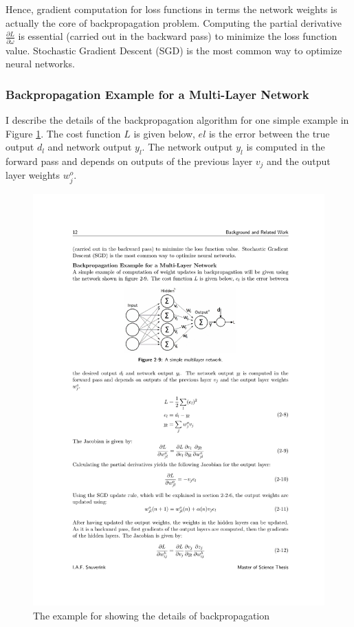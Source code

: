     Hence, gradient computation for loss functions in terms the network weights is actually the core of backpropagation problem. Computing the partial derivative $\frac{\partial L}{\partial \omega}$ is essential (carried out in the backward pass) to minimize the loss function value. Stochastic Gradient Descent (SGD) is the most common way to optimize neural networks.

    \subsubsection{Backpropagation Example for a Multi-Layer Network}
    I describe the details of the backpropagation algorithm for one simple example in Figure \ref{bp}. The cost function $L$ is given below, $el$ is the error between the true output $d_l$ and network output $y_l$. The network output $y_l$ is computed in the forward pass and depends on outputs of the previous layer $v_j$ and the output layer weights $w^{o}_j$.
    \begin{figure}[!h]
        \centering
        \includegraphics{Figures/bp.pdf}
        \caption{The example for showing the details of backpropagation}
        \label{bp}
    \end{figure}
